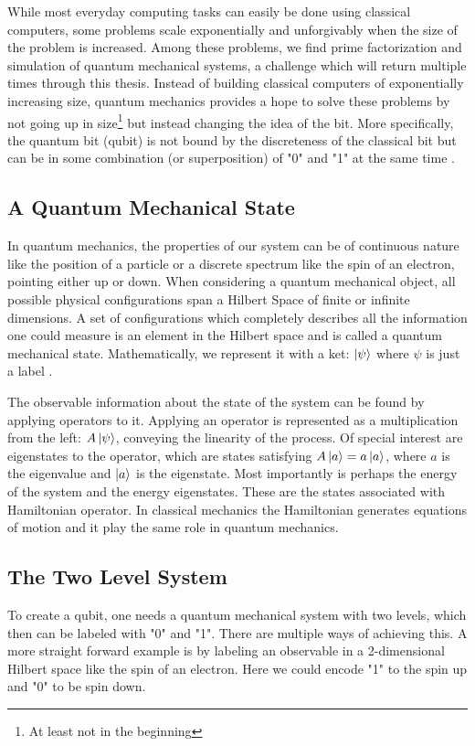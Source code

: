 While most everyday computing tasks can easily be done using classical computers, some problems scale exponentially and unforgivably when the size of the problem is increased. Among these problems, we find prime factorization and simulation of quantum mechanical systems, a challenge which will return multiple times through this thesis. Instead of building classical computers of exponentially increasing size, quantum mechanics provides a hope to solve these problems by not going up in size\footnote{At least not in the beginning} but instead changing the idea of the bit. More specifically, the quantum bit (qubit) is not bound by the discreteness of the classical bit but can be in some combination (or superposition) of "0" and "1" at the same time \cite{krantz_week_2019}.

\subsection{A Quantum Mechanical State}
In quantum mechanics, the properties of our system can be of continuous   nature like the position of a particle or a discrete spectrum like the spin of an electron, pointing either up or down. When considering a quantum mechanical object, all possible physical configurations span a Hilbert Space of finite or infinite dimensions. A set of configurations which completely describes all the information one could measure is an element in the Hilbert space and is called a quantum mechanical state. Mathematically, we represent it with a ket: $\ket{\psi}$ where $\psi$ is just a label \cite{sakurai_modern_2021}.

The observable information about the state of the system can be found by applying operators to it. Applying an operator is represented as a multiplication from the left: $A\ket{\psi}$, conveying the linearity of the process. Of special interest are eigenstates to the operator, which are states satisfying $A\ket{a} = a \ket{a}$, where $a$ is the eigenvalue and $\ket{a}$ is the eigenstate. Most importantly is perhaps the energy of the system and the energy eigenstates. These are the states associated with Hamiltonian operator. In classical mechanics the Hamiltonian generates equations of motion and it play the same role in quantum mechanics. \cite{sakurai_modern_2021}

\subsection{The Two Level System}\label{sec:tls}
To create a qubit, one needs a quantum mechanical system with two levels, which then can be labeled with "0" and "1". There are multiple ways of achieving this. A more straight forward example is by labeling an observable in a 2-dimensional Hilbert space like the spin of an electron. Here we could encode "1" to the spin up and "0" to be spin down. 

